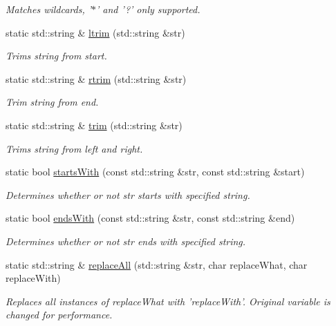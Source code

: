 \begin{DoxyCompactItemize}
\begin{DoxyCompactList}\small\item\em Matches wildcards, '$\ast$' and '?' only supported. \end{DoxyCompactList}\item 
static std\-::string \& \hyperlink{classel_1_1base_1_1utils_1_1Str_a64b7a841f04ed916ed8d234b8508703e}{ltrim} (std\-::string \&str)
\begin{DoxyCompactList}\small\item\em Trims string from start. \end{DoxyCompactList}\item 
static std\-::string \& \hyperlink{classel_1_1base_1_1utils_1_1Str_a9202797763e10861c4fa84ffd40198bb}{rtrim} (std\-::string \&str)
\begin{DoxyCompactList}\small\item\em Trim string from end. \end{DoxyCompactList}\item 
static std\-::string \& \hyperlink{classel_1_1base_1_1utils_1_1Str_aba0bc132c410fd3c1e128d1038e996ba}{trim} (std\-::string \&str)
\begin{DoxyCompactList}\small\item\em Trims string from left and right. \end{DoxyCompactList}\item 
static bool \hyperlink{classel_1_1base_1_1utils_1_1Str_acf80221cec72da701ef50995a61ab91f}{starts\-With} (const std\-::string \&str, const std\-::string \&start)
\begin{DoxyCompactList}\small\item\em Determines whether or not str starts with specified string. \end{DoxyCompactList}\item 
static bool \hyperlink{classel_1_1base_1_1utils_1_1Str_a5bcf5f6cc41a7ed683be115148579561}{ends\-With} (const std\-::string \&str, const std\-::string \&end)
\begin{DoxyCompactList}\small\item\em Determines whether or not str ends with specified string. \end{DoxyCompactList}\item 
static std\-::string \& \hyperlink{classel_1_1base_1_1utils_1_1Str_aa07bfda259ed194120b371401734ae86}{replace\-All} (std\-::string \&str, char replace\-What, char replace\-With)
\begin{DoxyCompactList}\small\item\em Replaces all instances of replace\-What with 'replace\-With'. Original variable is changed for performance. \end{DoxyCompactList}\item 

\end{DoxyCompactItemize}
